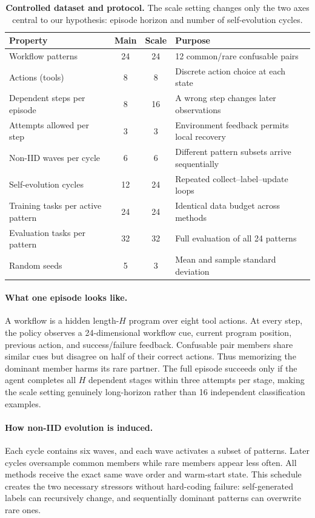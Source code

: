 \documentclass[10pt]{article}
\begin{document}
\begin{table}[t]
\centering
\small
\caption{\textbf{Controlled dataset and protocol.}  The scale setting changes
only the two axes central to our hypothesis: episode horizon and number of
self-evolution cycles.}
\label{tab:dataset}
\begin{tabular}{p{4.0cm}ccp{5.0cm}}
\toprule
Property & Main & Scale & Purpose\\
\midrule
Workflow patterns & 24 & 24 & 12 common/rare confusable pairs\\
Actions (tools) & 8 & 8 & Discrete action choice at each state\\
Dependent steps per episode & 8 & 16 & A wrong step changes later observations\\
Attempts allowed per step & 3 & 3 & Environment feedback permits local recovery\\
Non-IID waves per cycle & 6 & 6 & Different pattern subsets arrive sequentially\\
Self-evolution cycles & 12 & 24 & Repeated collect--label--update loops\\
Training tasks per active pattern & 24 & 24 & Identical data budget across methods\\
Evaluation tasks per pattern & 32 & 32 & Full evaluation of all 24 patterns\\
Random seeds & 5 & 3 & Mean and sample standard deviation\\
\bottomrule
\end{tabular}
\end{table}

\paragraph{What one episode looks like.}
A workflow is a hidden length-$H$ program over eight tool actions.  At every
step, the policy observes a 24-dimensional workflow cue, current program
position, previous action, and success/failure feedback.  Confusable pair
members share similar cues but disagree on half of their correct actions.
Thus memorizing the dominant member harms its rare partner.  The full episode
succeeds only if the agent completes all $H$ dependent stages within three
attempts per stage, making the scale setting genuinely long-horizon rather than
16 independent classification examples.

\paragraph{How non-IID evolution is induced.}
Each cycle contains six waves, and each wave activates a subset of patterns.
Later cycles oversample common members while rare members appear less often.
All methods receive the exact same wave order and warm-start state.  This
schedule creates the two necessary stressors without hard-coding failure:
self-generated labels can recursively change, and sequentially dominant
patterns can overwrite rare ones.
\end{document}
